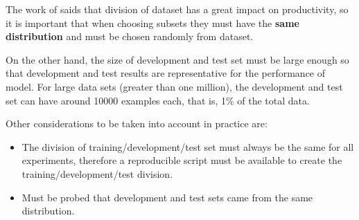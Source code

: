 The work of  saids that division of dataset has a great impact on productivity, so it is important that when choosing subsets they must have the \textbf{same distribution} and must be chosen randomly from dataset.

\vspace{5mm} %

On the other hand, the size of development and test set must be large enough so that development and test results are representative for the performance of model. For large data sets (greater than one million), the development and test set can have around 10000 examples each, that is, 1\% of the total data.

\vspace{5mm} %

Other considerations to be taken into account in practice are:

\begin{itemize}
\item The division of training/development/test set must always be the same for all experiments, therefore a reproducible script must be available to create the training/development/test division.
\item Must be probed that development and test sets came from the same distribution.
\end{itemize}

